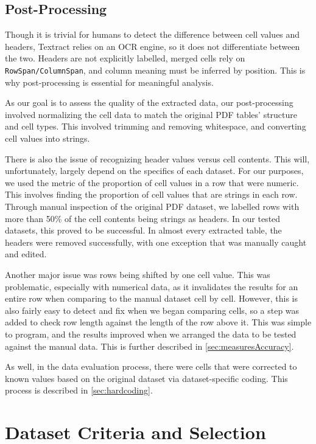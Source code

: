 \documentclass[12pt]{article}
\begin{document}
\subsection{Post-Processing}\label{sec:postprocessing}
Though it is trivial for humans to detect the difference between cell values and headers, Textract relies on an OCR engine, so it does not differentiate between the two. Headers are not explicitly labelled, merged cells rely on \texttt{RowSpan/ColumnSpan}, and column meaning must be inferred by position. This is why post-processing is essential for meaningful analysis.

As our goal is to assess the quality of the extracted data, our post-processing involved normalizing the cell data to match the original PDF tables' structure and cell types. This involved trimming and removing whitespace, and converting cell values into strings.

There is also the issue of recognizing header values versus cell contents. This will, unfortunately, largely depend on the specifics of each dataset. For our purposes, we used the metric of the proportion of cell values in a row that were numeric. This involves finding the proportion of cell values that are strings in each row. Through manual inspection of the original PDF dataset, we labelled rows with more than 50\% of the cell contents being strings as headers. In our tested datasets, this proved to be successful. In almost every extracted table, the headers were removed successfully, with one exception that was manually caught and edited.

Another major issue was rows being shifted by one cell value. This was problematic, especially with numerical data, as it invalidates the results for an entire row when comparing to the manual dataset cell by cell. However, this is also fairly easy to detect and fix when we began comparing cells, so a step was added to check row length against the length of the row above it. This was simple to program, and the results improved when we arranged the data to be tested against the manual data. This is further described in \cref{sec:measuresAccuracy}.

As well, in the data evaluation process, there were cells that were corrected to known values based on the original dataset via dataset-specific coding. This process is described in \cref{sec:hardcoding}.



\section{Dataset Criteria and Selection}
\end{document}
